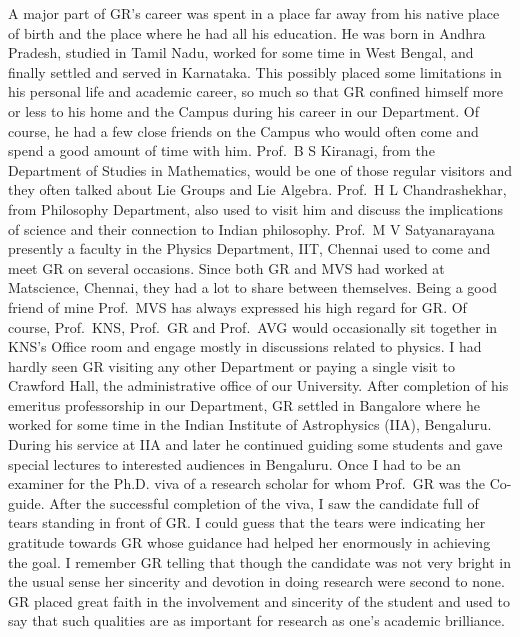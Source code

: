 A major part of GR's career was spent in a place far away from his native place of birth and the place where he had all his education. He was born in Andhra Pradesh, studied in Tamil Nadu, worked for some time in West Bengal, and finally settled and served in Karnataka. This possibly placed some limitations in his personal life and academic career, so much so that GR confined himself more or less to his home and the Campus during his career in our Department. Of course, he had a few close friends on the Campus who would often come and spend a good amount of time with him. Prof.\ B S Kiranagi, from the Department of Studies in Mathematics, would be one of those regular visitors and they often talked about Lie Groups and Lie Algebra. Prof.\ H L Chandrashekhar, from Philosophy Department, also used to visit him and discuss the implications of science and their connection to Indian philosophy. Prof.\ M V Satyanarayana presently a faculty in the Physics Department, IIT, Chennai used to come and meet GR on several occasions. Since both GR and MVS had worked at Matscience, Chennai, they had a lot to share between themselves. Being a good friend of mine Prof.\ MVS has always expressed his high regard for GR. Of course, Prof.\ KNS, Prof.\ GR and Prof.\ AVG would occasionally sit together in KNS's Office room and engage mostly in discussions related to physics. I had hardly seen GR visiting any other Department or paying a single visit to Crawford Hall, the administrative office of our University. After completion of his emeritus professorship in our Department, GR settled in Bangalore where he worked for some time in the Indian Institute of Astrophysics (IIA), Bengaluru. During his service at IIA and later he continued guiding some students and gave special lectures to interested audiences in Bengaluru. Once I had to be an examiner for the Ph.D. viva of a research scholar for whom Prof.\ GR was the Co-guide. After the successful completion of the viva, I saw the candidate full of tears standing in front of GR. I could guess that the tears were indicating her gratitude towards GR whose guidance had helped her enormously in achieving the goal. I remember GR telling that though the candidate was not very bright in the usual sense her sincerity and devotion in doing research were second to none. GR placed great faith in the involvement and sincerity of the student and used to say that such qualities are as important for research as one's academic brilliance.

